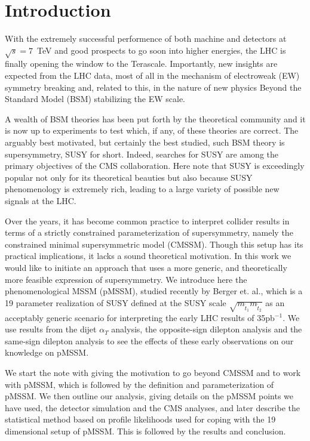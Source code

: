 \section{Introduction}
\label{sec:intro}

With the extremely successful performence of both machine and detectors
at $\sqrt{s}=7$~TeV and good prospects to go soon into higher energies, 
the LHC is finally opening the window to the Terascale. 
Importantly, new insights are expected from the 
LHC data, most of all in the mechanism of electroweak (EW) symmetry 
breaking and, related to this, in the nature of new physics Beyond 
the Standard Model (BSM) stabilizing the EW scale. 

A wealth of BSM theories has been put forth by the theoretical community 
 and it is now up to experiments to test which, if any, of these theories are correct. 
The arguably best motivated, but certainly the best studied, such BSM 
theory is supersymmetry, SUSY for short. Indeed, searches for SUSY are 
among the primary objectives of the CMS collaboration. Here note that 
SUSY is exceedingly popular not only for its theoretical beauties but 
also because SUSY phenomenology is extremely rich, 
leading to a large variety of possible new signals at the LHC. 

Over the years, it has become common practice to interpret collider results in terms of a strictly constrained parameterization of supersymmetry, namely the constrained minimal supersymmetric model (CMSSM).  Though this setup has its practical implications, it lacks a sound theoretical motivation.  In this work we would like to initiate an approach that uses a more generic, and theoretically more feasible expression of supersymmetry.  We introduce here  the phenomenological MSSM (pMSSM), studied recently by Berger et. al., which is a 19 parameter realization of SUSY defined at the SUSY scale $\sqrt{m_{\tilde{t}_1}m_{\tilde{t}_2}}$ as an acceptably generic scenario for interpreting the early LHC results of 35pb$^{-1}$.  We use results from the dijet $\alpha_T$ analysis, the opposite-sign dilepton analysis and the same-sign dilepton analysis to see the effects of these early observations on our knowledge on pMSSM.

We start the note with giving the motivation to go beyond CMSSM and to work with pMSSM, which is followed by the definition and parameterization of pMSSM.  We then outline our analysis, giving details on the pMSSM points we have used, the detector simulation and the CMS analyses, and later describe the statistical method based on profile likelihoods used for coping with the 19 dimensional setup of pMSSM.  This is followed by the results and conclusion.

